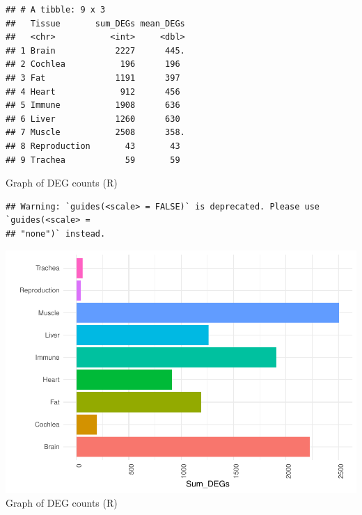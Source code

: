 \documentclass[
]{article}
\newenvironment{Shaded}{\begin{snugshade}}{\end{snugshade}}
\newcommand{\DataTypeTok}[1]{\textcolor[rgb]{0.13,0.29,0.53}{#1}}
\newcommand{\DecValTok}[1]{\textcolor[rgb]{0.00,0.00,0.81}{#1}}
\newcommand{\KeywordTok}[1]{\textcolor[rgb]{0.13,0.29,0.53}{\textbf{#1}}}
\newcommand{\NormalTok}[1]{#1}
\newcommand{\OperatorTok}[1]{\textcolor[rgb]{0.81,0.36,0.00}{\textbf{#1}}}
\newcommand{\OtherTok}[1]{\textcolor[rgb]{0.56,0.35,0.01}{#1}}
\newcommand{\StringTok}[1]{\textcolor[rgb]{0.31,0.60,0.02}{#1}}
\begin{document}
\begin{verbatim}
## # A tibble: 9 x 3
##   Tissue       sum_DEGs mean_DEGs
##   <chr>           <int>     <dbl>
## 1 Brain            2227      445.
## 2 Cochlea           196      196 
## 3 Fat              1191      397 
## 4 Heart             912      456 
## 5 Immune           1908      636 
## 6 Liver            1260      630 
## 7 Muscle           2508      358.
## 8 Reproduction       43       43 
## 9 Trachea            59       59
\end{verbatim}

Graph of DEG counts (R)

\begin{Shaded}
\end{Shaded}

\begin{verbatim}
## Warning: `guides(<scale> = FALSE)` is deprecated. Please use `guides(<scale> =
## "none")` instead.
\end{verbatim}

\includegraphics{Thesis_DualCodeTest_files/figure-latex/unnamed-chunk-41-1.pdf}
Graph of DEG counts (R)
\end{document}
